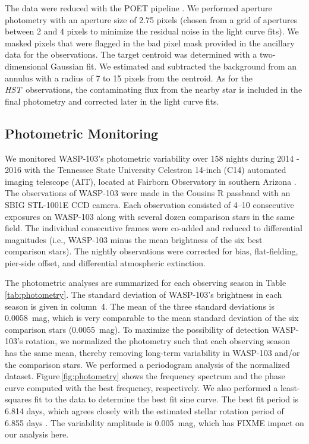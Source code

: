 \documentclass[twocolumn]{aastex61}
\newcommand{\project}[1]{\textsl{#1}}
\newcommand{\HST}{\project{HST}}
\begin{document}
The data were reduced with the POET pipeline \citep{stevenson12}. We performed aperture photometry with an aperture size of 2.75 pixels (chosen from a grid of apertures between 2 and 4 pixels to minimize the residual noise in the light curve fits). We masked pixels that were flagged in the bad pixel mask provided in the ancillary data for the observations. The target centroid was determined with a two-dimensional Gaussian fit.  We estimated and subtracted the background from an annulus with a radius of 7 to 15 pixels from the centroid. As for the \HST\ observations, the contaminating flux from the nearby star is included in the final photometry and corrected later in the light curve fits.


\subsection{Photometric Monitoring}
We monitored WASP-103's photometric variability over 158 nights during 2014 - 2016 with the Tennessee State University Celestron 14-inch (C14) automated imaging telescope (AIT), located at Fairborn Observatory in southern Arizona \citep[see, e.g.,][]{h1999, ehf2003}.  The observations of WASP-103 were made in the Cousins R passband with an SBIG STL-1001E CCD camera.  Each observation consisted of 4--10 consecutive exposures on WASP-103 along with several dozen comparison stars in the same field. The individual consecutive frames were co-added and reduced to differential magnitudes (i.e., WASP-103 minus the mean brightness of the six best comparison stars). The nightly observations were corrected for bias, flat-fielding, pier-side offset, and differential atmospheric extinction.  

The photometric analyses are summarized for each observing season in Table\,\ref{tab:photometry}.  The standard deviation of WASP-103's brightness in each season is given in column~4.  The mean of the three standard deviations is 0.0058~mag, which is very comparable to the mean standard deviation of the six comparison stars (0.0055~mag).  To maximize the possibility of detection WASP-103's rotation, we normalized the photometry such that each observing season has the same mean, thereby removing long-term variability in WASP-103 and/or the comparison stars. We performed a periodogram analysis of the normalized dataset. Figure\,\ref{fig:photometry} shows the frequency spectrum and the phase curve computed with the best frequency, respectively.  We also performed a least-squares fit to the data to determine the best fit sine curve. The best fit period is 6.814 days, which agrees closely with the estimated stellar rotation period of 6.855 days \citep{getal2014}.  The variability amplitude is 0.005~mag, which has FIXME impact on our analysis here.
\end{document}
